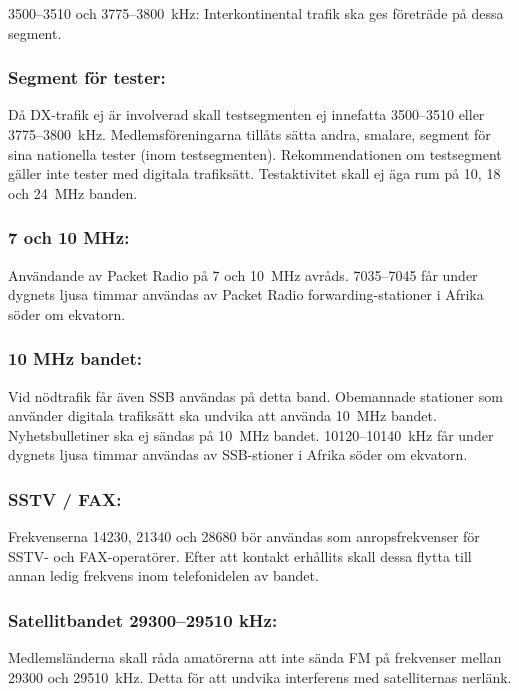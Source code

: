 3500--3510 och 3775--3800~kHz:
Interkontinental trafik ska ges företräde på dessa segment.

\subsubsection{Segment för tester:}

Då DX-trafik ej är involverad skall testsegmenten ej innefatta
3500--3510 eller 3775--3800~kHz. Medlemsföreningarna tillåts
sätta andra, smalare, segment för sina nationella tester
(inom testsegmenten). Rekommendationen om testsegment gäller
inte tester med digitala trafiksätt.
Testaktivitet skall ej äga rum på 10, 18 och 24~MHz banden.

\subsubsection{7 och 10 MHz:}

Användande av Packet Radio på 7 och 10~MHz avråds.
7035--7045 får under dygnets ljusa timmar användas av
Packet Radio forwarding-stationer i Afrika söder om
ekvatorn.

\subsubsection{10 MHz bandet:}

Vid nödtrafik får även SSB användas på detta band.
Obemannade stationer som använder digitala trafiksätt ska undvika att
använda 10~MHz bandet.
Nyhetsbulletiner ska ej sändas på 10~MHz bandet.
10120--10140~kHz får under dygnets ljusa timmar användas av
SSB-stioner i Afrika söder om ekvatorn.

\subsubsection{SSTV / FAX:}

Frekvenserna 14230, 21340 och 28680 bör användas
som anropsfrekvenser för SSTV- och FAX-operatörer.
Efter att kontakt erhållits skall dessa flytta till annan
ledig frekvens inom telefonidelen av bandet.

\subsubsection{Satellitbandet 29300--29510 kHz:}

Medlemsländerna skall råda amatörerna att inte sända
FM på frekvenser mellan 29300 och 29510~kHz. Detta
för att undvika interferens med satelliternas nerlänk.

